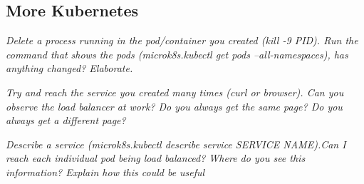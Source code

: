 \documentclass[
]{article}
\begin{document}
\subsection{More Kubernetes}\label{more-kubernetes}

\emph{Delete a process running in the pod/container you created (kill -9
PID). Run the command that shows the pods (microk8s.kubectl get pods
--all-namespaces), has anything changed? Elaborate.}

\emph{Try and reach the service you created many times (curl or
browser). Can you observe the load balancer at work? Do you always get
the same page? Do you always get a different page?}

\emph{Describe a service (microk8s.kubectl describe service SERVICE
NAME).Can I reach each individual pod being load balanced? Where do you
see this information? Explain how this could be useful}
\end{document}

